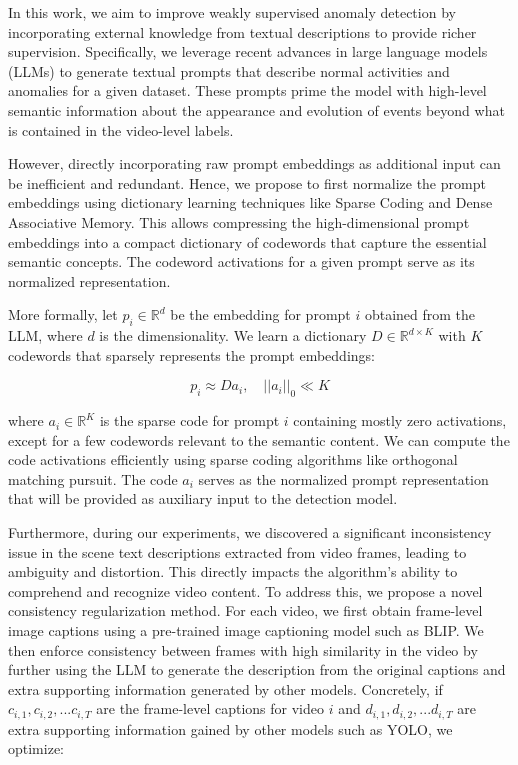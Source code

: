 In this work, we aim to improve weakly supervised anomaly detection by incorporating external knowledge from textual descriptions to provide richer supervision. Specifically, we leverage recent advances in large language models (LLMs) to generate textual prompts that describe normal activities and anomalies for a given dataset\citep{a-zhao2023survey}. These prompts prime the model with high-level semantic information about the appearance and evolution of events beyond what is contained in the video-level labels. 

However, directly incorporating raw prompt embeddings as additional input can be inefficient and redundant. Hence, we propose to first normalize the prompt embeddings using dictionary learning techniques\citep{a-tovsic2011dictionary} like Sparse Coding\citep{a-lee2006efficient} and Dense Associative Memory\citep{a-krotov2016dense}. This allows compressing the high-dimensional prompt embeddings into a compact dictionary of codewords that capture the essential semantic concepts. The codeword activations for a given prompt serve as its normalized representation. 

More formally, let $p_i \in \mathbb{R}^d$ be the embedding for prompt $i$ obtained from the LLM, where $d$ is the dimensionality. We learn a dictionary $D \in \mathbb{R}^{d \times K}$ with $K$ codewords that sparsely represents the prompt embeddings:

\begin{equation}
p_i \approx D a_i, \quad ||a_i||_0 \ll K
\end{equation}

where $a_i \in \mathbb{R}^K$ is the sparse code for prompt $i$ containing mostly zero activations, except for a few codewords relevant to the semantic content. We can compute the code activations efficiently using sparse coding algorithms like orthogonal matching pursuit. The code $a_i$ serves as the normalized prompt representation that will be provided as auxiliary input to the detection model.

Furthermore, during our experiments, we discovered a significant inconsistency issue in the scene text descriptions extracted from video frames, leading to ambiguity and distortion. This directly impacts the algorithm's ability to comprehend and recognize video content. To address this, we propose a novel consistency regularization method. For each video, we first obtain frame-level image captions using a pre-trained image captioning model such as BLIP\citep{a-li2022blip,a-li2023blip}. We then enforce consistency between frames with high similarity in the video by further using the LLM to generate the description from the original captions and extra supporting information generated by other models. Concretely, if $c_{i,1}, c_{i,2}, ... c_{i,T}$ are the frame-level captions for video $i$ and $d_{i,1}, d_{i,2}, ... d_{i,T}$ are extra supporting information gained by other models such as YOLO, we optimize: 

